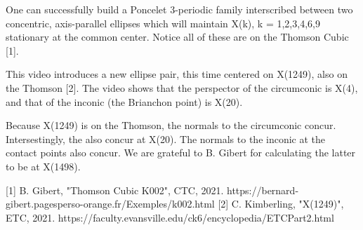 One can successfully build a Poncelet 3-periodic family interscribed between two concentric, axis-parallel ellipses which will maintain X(k), k = 1,2,3,4,6,9 stationary at the common center. Notice all of these are on the Thomson Cubic [1].

This video introduces a new ellipse pair, this time centered on X(1249), also on the Thomson [2]. The video shows that the perspector of the circumconic is X(4), and that of the inconic (the Brianchon point) is X(20).

Because X(1249) is on the Thomson, the normals to the circumconic concur. Intersestingly, the also concur at X(20). The normals to the inconic at the contact points also concur. We are grateful to B. Gibert for calculating the latter to be at X(1498).

[1] B. Gibert, "Thomson Cubic K002", CTC, 2021. https://bernard-gibert.pagesperso-orange.fr/Exemples/k002.html
[2] C. Kimberling, "X(1249)", ETC, 2021. https://faculty.evansville.edu/ck6/encyclopedia/ETCPart2.html